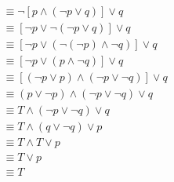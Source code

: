\documentclass[12pt letter]{report}
\begin{document}
{\begin{enumerate}
\begin{align*}
			                                               & \equiv \neg [p \wedge \left( \neg p \vee q \right) ] \vee q
			      \tag*{Conditional Disjunction Equivalence}                                                                                               \\
			                                               & \equiv [\neg p \vee \neg \left( \neg p \vee q \right) ]
			      \vee q \tag*{By the First De Morgan's Law}                                                                                               \\
			                                               & \equiv [\neg p \vee \left( \neg \left( \neg p \right)
				      \wedge \neg q \right) ] \vee q \tag*{By the Second De
			      Morgan's Law}                                                                                                                            \\
			                                               & \equiv [\neg p \vee \left( p \wedge \neg q \right) ] \vee q \tag*{By the Double Negation Law} \\
			                                               & \equiv [ \left( \neg p \vee p \right) \wedge \left( \neg p
			      \vee \neg q \right)  ] \vee  q \tag*{By the First Distributive Law}                                                                      \\
			                                               & \equiv \left( p \vee \neg p \right) \wedge \left( \neg p
			      \vee \neg q \right) \vee q \tag*{By the First Commutative
			      Law}                                                                                                                                     \\
			                                               & \equiv T \wedge \left( \neg p \vee \neg q \right) \vee q
			      \tag*{By the First Negation Law}                                                                                                         \\
			                                               & \equiv T \wedge (q \vee \neg q) \vee p \tag*{By the First
			      Associative Law and the First Commutative Law}                                                                                           \\
			                                               & \equiv T \wedge  T \vee  p \tag*{By the First Negation Law}                                   \\
			                                               & \equiv T \vee p \tag*{By the First Identity Law}                                              \\
			                                               & \equiv T \tag*{By the First Domination Law}
		      \end{align*}
	\end{enumerate}
}
\end{document}
